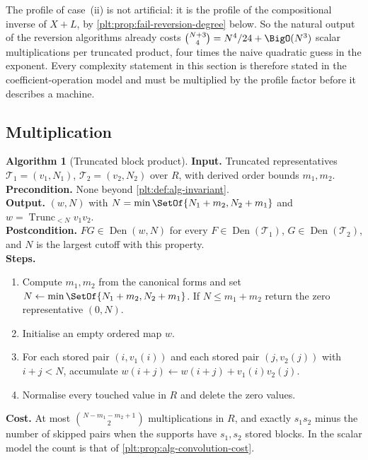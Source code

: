 \documentclass[11pt,oneside]{article}
\theoremstyle{plain}
\theoremstyle{definition}
\newtheorem{algorithm}[theorem]{Algorithm}
\theoremstyle{remark}
\newcommand{\Trunc}[2]{\operatorname{Trunc}_{<#2}#1}     %
\begin{document}
\begin{warningbox}
The profile of case~(ii) is not artificial: it is the profile of the
compositional inverse of \(X+L\), by
\cref{plt:prop:fail-reversion-degree} below.  So the natural output of the
reversion algorithms already costs \(\binom{N+3}{4}=N^4/24+\BigO(N^3)\) scalar
multiplications per truncated product, four times the naive quadratic guess in
the exponent.  Every complexity statement in this section is therefore stated
in the coefficient-operation model and must be multiplied by the profile factor
before it describes a machine.
\end{warningbox}


\subsection{Multiplication}
\label{plt:sec:alg-multiplication}

\begin{algorithm}[Truncated block product]\label{plt:alg:multiply}
\textbf{Input.}  Truncated representatives \(\mathcal T_1=(v_1,N_1)\),
\(\mathcal T_2=(v_2,N_2)\) over \(R\), with derived order bounds \(m_1,m_2\).\\
\textbf{Precondition.}  None beyond \cref{plt:def:alg-invariant}.\\
\textbf{Output.}  \((w,N)\) with \(N=\min\SetOf{N_1+m_2,N_2+m_1}\) and
\(w=\Trunc{v_1v_2}{N}\).\\
\textbf{Postcondition.}  \(FG\in\operatorname{Den}(w,N)\) for every
\(F\in\operatorname{Den}(\mathcal T_1)\), \(G\in\operatorname{Den}(\mathcal T_2)\),
and \(N\) is the largest cutoff with this property.\\
\textbf{Steps.}
\begin{enumerate}
\item Compute \(m_1,m_2\) from the canonical forms and set
      \(N\leftarrow\min\SetOf{N_1+m_2,N_2+m_1}\).  If \(N\le m_1+m_2\) return
      the zero representative \((0,N)\).
\item Initialise an empty ordered map \(w\).
\item For each stored pair \((i,v_1(i))\) and each stored pair
      \((j,v_2(j))\) with \(i+j<N\), accumulate
      \(w(i+j)\leftarrow w(i+j)+v_1(i)v_2(j)\).
\item Normalise every touched value in \(R\) and delete the zero values.
\end{enumerate}
\textbf{Cost.}  At most \(\binom{N-m_1-m_2+1}{2}\) multiplications in \(R\),
and exactly \(s_1s_2\) minus the number of skipped pairs when the supports have
\(s_1,s_2\) stored blocks.  In the scalar model the count is that of
\cref{plt:prop:alg-convolution-cost}.
\end{algorithm}
\end{document}
